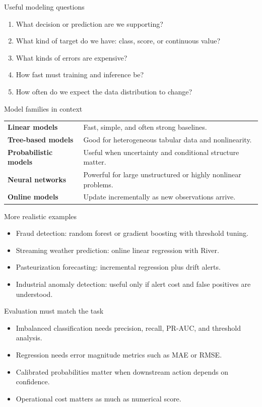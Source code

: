 \begin{frame}{Useful modeling questions}
\begin{enumerate}
\item What decision or prediction are we supporting?
\item What kind of target do we have: class, score, or continuous value?
\item What kinds of errors are expensive?
\item How fast must training and inference be?
\item How often do we expect the data distribution to change?
\end{enumerate}
\coursefooter
\end{frame}

\begin{frame}{Model families in context}
\begin{tabularx}{\textwidth}{>{\bfseries}l X}
Linear models & Fast, simple, and often strong baselines. \\
Tree-based models & Good for heterogeneous tabular data and nonlinearity. \\
Probabilistic models & Useful when uncertainty and conditional structure matter. \\
Neural networks & Powerful for large unstructured or highly nonlinear problems. \\
Online models & Update incrementally as new observations arrive. \\
\end{tabularx}
\coursefooter
\end{frame}

\begin{frame}{More realistic examples}
\begin{itemize}
\item Fraud detection: random forest or gradient boosting with threshold tuning.
\item Streaming weather prediction: online linear regression with River.
\item Pasteurization forecasting: incremental regression plus drift alerts.
\item Industrial anomaly detection: useful only if alert cost and false positives are understood.
\end{itemize}
\coursefooter
\end{frame}

\begin{frame}{Evaluation must match the task}
\begin{itemize}
\item Imbalanced classification needs precision, recall, PR-AUC, and threshold analysis.
\item Regression needs error magnitude metrics such as MAE or RMSE.
\item Calibrated probabilities matter when downstream action depends on confidence.
\item Operational cost matters as much as numerical score.
\end{itemize}
\coursefooter
\end{frame}

